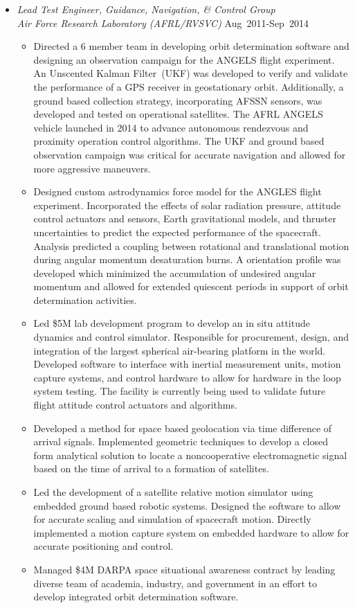 \begin{itemize}
\item[] \textit{Lead Test Engineer, Guidance, Navigation, \& Control Group \\
    Air Force Research Laboratory (AFRL/RVSVC)}%
    \hfill {Aug~2011-Sep~2014}
\begin{itemize}
    \item Directed a 6 member team in developing orbit determination software and designing an observation campaign for the ANGELS flight experiment.
    An Unscented Kalman Filter~(UKF) was developed to verify and validate the performance of a GPS receiver in geostationary orbit.
    Additionally, a ground based collection strategy, incorporating AFSSN sensors, was developed and tested on operational satellites.
    The AFRL ANGELS vehicle launched in 2014 to advance autonomous rendezvous and proximity operation control algorithms.
    The UKF and ground based observation campaign was critical for accurate navigation and allowed for more aggressive maneuvers. 
    \item Designed custom astrodynamics force model for the ANGLES flight experiment.
    Incorporated the effects of solar radiation pressure, attitude control actuators and sensors, Earth gravitational models, and thruster uncertainties to predict the expected performance of the spacecraft.
    Analysis predicted a coupling between rotational and translational motion during angular momentum desaturation burns.
    A orientation profile was developed which minimized the accumulation of undesired angular momentum and allowed for extended quiescent periods in support of orbit determination activities.
    \item Led \$5M lab development program to develop an in situ attitude dynamics and control simulator.  
    Responsible for procurement, design, and integration of the largest spherical air-bearing platform in the world.
    Developed software to interface with inertial measurement units, motion capture systems, and control hardware to allow for hardware in the loop system testing.
    The facility is currently being used to validate future flight attitude control actuators and algorithms. 
    \item Developed a method for space based geolocation via time difference of arrival signals.
    Implemented geometric techniques to develop a closed form analytical solution to locate a noncooperative electromagnetic signal based on the time of arrival to a formation of satellites.
    \item Led the development of a satellite relative motion simulator using embedded ground based robotic systems.
    Designed the software to allow for accurate scaling and simulation of spacecraft motion.
    Directly implemented a motion capture system on embedded hardware to allow for accurate positioning and control. 
    \item Managed \$4M DARPA space situational awareness contract by leading diverse team of academia, industry, and government in an effort to develop integrated orbit determination software.
\end{itemize}


\end{itemize}
